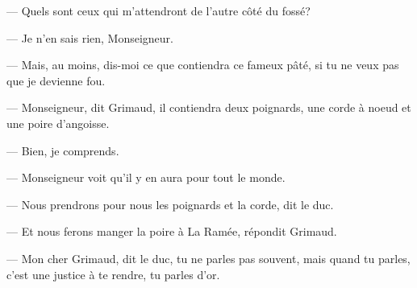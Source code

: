 — Quels sont ceux qui m'attendront de l'autre côté du fossé?

— Je n'en sais rien, Monseigneur.

— Mais, au moins, dis-moi ce que contiendra ce fameux pâté, si tu ne veux pas que je devienne fou.

— Monseigneur, dit Grimaud, il contiendra deux poignards, une corde à noeud et une poire d'angoisse.

— Bien, je comprends.

— Monseigneur voit qu'il y en aura pour tout le monde.

— Nous prendrons pour nous les poignards et la corde, dit le duc.

— Et nous ferons manger la poire à La Ramée, répondit Grimaud.

— Mon cher Grimaud, dit le duc, tu ne parles pas souvent, mais quand tu parles, c'est une justice à te rendre, tu parles d'or.